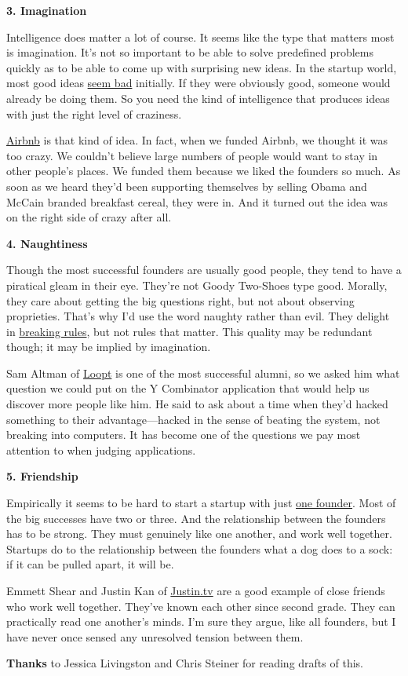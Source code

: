 \textbf{3. Imagination}

Intelligence does matter a lot of course. It seems like the type that
matters most is imagination. It's not so important to be able to solve
predefined problems quickly as to be able to come up with surprising new
ideas. In the startup world, most good ideas \href{googles.html}{seem
bad} initially. If they were obviously good, someone would already be
doing them. So you need the kind of intelligence that produces ideas
with just the right level of craziness.

\href{http://airbnb.com}{Airbnb} is that kind of idea. In fact, when we
funded Airbnb, we thought it was too crazy. We couldn't believe large
numbers of people would want to stay in other people's places. We funded
them because we liked the founders so much. As soon as we heard they'd
been supporting themselves by selling Obama and McCain branded breakfast
cereal, they were in. And it turned out the idea was on the right side
of crazy after all.

\textbf{4. Naughtiness}

Though the most successful founders are usually good people, they tend
to have a piratical gleam in their eye. They're not Goody Two-Shoes type
good. Morally, they care about getting the big questions right, but not
about observing proprieties. That's why I'd use the word naughty rather
than evil. They delight in \href{gba.html}{breaking rules}, but not
rules that matter. This quality may be redundant though; it may be
implied by imagination.

Sam Altman of \href{http://loopt.com}{Loopt} is one of the most
successful alumni, so we asked him what question we could put on the Y
Combinator application that would help us discover more people like him.
He said to ask about a time when they'd hacked something to their
advantage---hacked in the sense of beating the system, not breaking into
computers. It has become one of the questions we pay most attention to
when judging applications.

\textbf{5. Friendship}

Empirically it seems to be hard to start a startup with just
\href{startupmistakes.html}{one founder}. Most of the big successes have
two or three. And the relationship between the founders has to be
strong. They must genuinely like one another, and work well together.
Startups do to the relationship between the founders what a dog does to
a sock: if it can be pulled apart, it will be.

Emmett Shear and Justin Kan of \href{http://justin.tv}{Justin.tv} are a
good example of close friends who work well together. They've known each
other since second grade. They can practically read one another's minds.
I'm sure they argue, like all founders, but I have never once sensed any
unresolved tension between them.

\textbf{Thanks} to Jessica Livingston and Chris Steiner for reading
drafts of this.